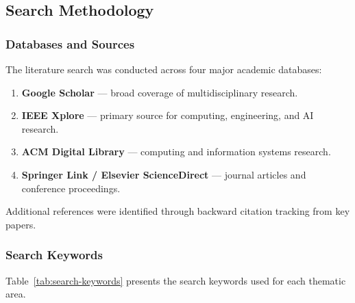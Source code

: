 \documentclass[12pt,a4paper]{article}
\begin{document}
\subsection{Search Methodology}
\label{sec:search-methodology}

\subsubsection{Databases and Sources}
\label{sec:databases}

The literature search was conducted across four major academic databases:

\begin{enumerate}[leftmargin=2em]
    \item \textbf{Google Scholar} --- broad coverage of multidisciplinary research.
    \item \textbf{IEEE Xplore} --- primary source for computing, engineering, and AI research.
    \item \textbf{ACM Digital Library} --- computing and information systems research.
    \item \textbf{Springer Link / Elsevier ScienceDirect} --- journal articles and conference proceedings.
\end{enumerate}

Additional references were identified through backward citation tracking from key papers.

\subsubsection{Search Keywords}
\label{sec:keywords}

Table~\ref{tab:search-keywords} presents the search keywords used for each thematic area.
\end{document}
